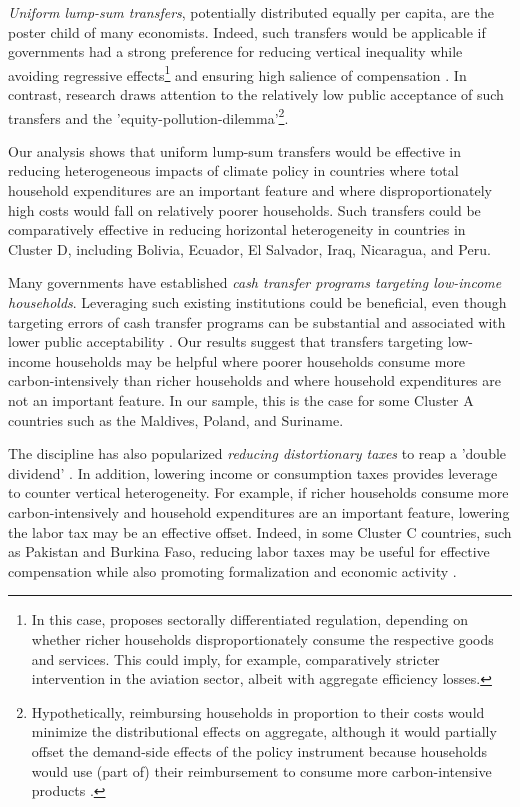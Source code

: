 \documentclass[12pt, a4paper]{article}
\begin{document}
\textit{Uniform lump-sum transfers}, potentially distributed equally per capita, are the poster child of many economists. Indeed, such transfers would be applicable if governments had a strong preference for reducing vertical inequality while avoiding regressive effects\footnote{In this case, \textcite{Stiglitz.2019} proposes sectorally differentiated regulation, depending on whether richer households disproportionately consume the respective goods and services. This could imply, for example, comparatively stricter intervention in the aviation sector, albeit with aggregate efficiency losses.} and ensuring high salience of compensation \autocite{Chetty.2009}. In contrast, research draws attention to the relatively low public acceptance of such transfers and the 'equity-pollution-dilemma'\footnote{Hypothetically, reimbursing households in proportion to their costs would minimize the distributional effects on aggregate, although it would partially offset the demand-side effects of the policy instrument because households would use (part of) their reimbursement to consume more carbon-intensive products \autocite[see also][]{Stiglitz.2019}.}\autocite{Sager.2019}.

Our analysis shows that uniform lump-sum transfers would be effective in reducing heterogeneous impacts of climate policy in countries where total household expenditures are an important feature and where disproportionately high costs would fall on relatively poorer households. Such transfers could be comparatively effective in reducing horizontal heterogeneity in countries in Cluster D, including Bolivia, Ecuador, El Salvador, Iraq, Nicaragua, and Peru. %

Many governments have established \textit{cash transfer programs targeting low-income households}. Leveraging such existing institutions could be beneficial, even though targeting errors of cash transfer programs can be substantial \autocite{Banerjee.2022} and associated with lower public acceptability \autocite{Bah.2019}. Our results suggest that transfers targeting low-income households may be helpful where poorer households consume more carbon-intensively than richer households and where household expenditures are not an important feature. In our sample, this is the case for some Cluster A countries such as the Maldives, Poland, and Suriname.

The discipline has also popularized \textit{reducing distortionary taxes} to reap a 'double dividend' \autocite{Bovenberg.1996}. In addition, lowering income or consumption taxes provides leverage to counter vertical heterogeneity. For example, if richer households consume more carbon-intensively and household expenditures are an important feature, lowering the labor tax may be an effective offset. Indeed, in some Cluster C countries, such as Pakistan and Burkina Faso, reducing labor taxes may be useful for effective compensation while also promoting formalization \autocite{Jessen.2021,Rocha.2018} and economic activity \autocite{Ulyssea.2018}.
\end{document}
